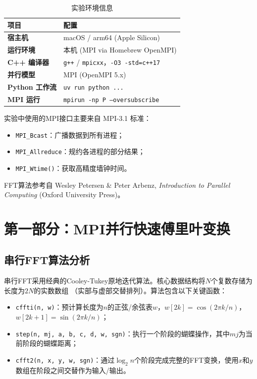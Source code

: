 \documentclass[UTF8,a4paper,12pt,fontset=none]{ctexart}
\begin{document}
\begin{table}[H]
  \centering
  \caption{实验环境信息}
  \renewcommand{\arraystretch}{1.2}
  \begin{tabularx}{0.92\textwidth}{>{\bfseries}p{4cm}X}
    \toprule
    项目 & 配置 \\
    \midrule
    宿主机 & macOS / arm64 (Apple Silicon) \\
    运行环境 & 本机 (MPI via Homebrew OpenMPI) \\
    C++ 编译器 & \texttt{g++} / \texttt{mpicxx}，\texttt{-O3 -std=c++17} \\
    并行模型 & MPI (OpenMPI 5.x) \\
    Python 工作流 & \texttt{uv run python ...} \\
    MPI 运行 & \texttt{mpirun -np P --oversubscribe} \\
    \bottomrule
  \end{tabularx}
\end{table}

实验中使用的MPI接口主要来自 MPI-3.1 标准：
\begin{itemize}[leftmargin=2.2em]
  \item \texttt{MPI\_Bcast}：广播数据到所有进程；
  \item \texttt{MPI\_Allreduce}：规约各进程的部分结果；
  \item \texttt{MPI\_Wtime()}：获取高精度墙钟时间。
\end{itemize}

FFT算法参考自 Wesley Petersen \& Peter Arbenz, \textit{Introduction to Parallel Computing} (Oxford University Press)。

\section{第一部分：MPI并行快速傅里叶变换}

\subsection{串行FFT算法分析}

串行FFT采用经典的Cooley-Tukey原地迭代算法。核心数据结构将$N$个复数存储为长度为$2N$的实数数组
（实部与虚部交替排列）。算法包含以下关键函数：

\begin{itemize}[leftmargin=2.2em]
  \item \texttt{cffti(n, w)}：预计算长度为$n$的正弦/余弦表$w$，$w[2k]=\cos(2\pi k/n)$，$w[2k+1]=\sin(2\pi k/n)$；
  \item \texttt{step(n, mj, a, b, c, d, w, sgn)}：执行一个阶段的蝴蝶操作，其中$mj$为当前阶段的蝴蝶距离；
  \item \texttt{cfft2(n, x, y, w, sgn)}：通过$\log_2 n$个阶段完成完整的FFT变换，使用$x$和$y$数组在阶段之间交替作为输入/输出。
\end{itemize}
\end{document}
